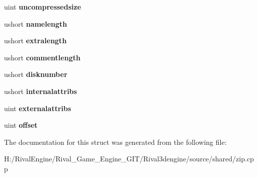 \begin{DoxyCompactItemize}
uint {\bfseries uncompressedsize}
\item 
\mbox{\label{structzipfileheader_a9992359c9a816960ff7c7295aee3c52a}} 
ushort {\bfseries namelength}
\item 
\mbox{\label{structzipfileheader_a2fe6aabe7028fce47fe00f43532910d1}} 
ushort {\bfseries extralength}
\item 
\mbox{\label{structzipfileheader_a19f6923a955cc2fe518b5e8c51937816}} 
ushort {\bfseries commentlength}
\item 
\mbox{\label{structzipfileheader_a87f957d3913b36c75a292b3b263125f3}} 
ushort {\bfseries disknumber}
\item 
\mbox{\label{structzipfileheader_a98e4a8df6c1a56bab905e50847f29d10}} 
ushort {\bfseries internalattribs}
\item 
\mbox{\label{structzipfileheader_ac8f652199a8083d84f64ea8463fd4cea}} 
uint {\bfseries externalattribs}
\item 
\mbox{\label{structzipfileheader_a647e71a9b17ab2a2e816a0e29e4ad6ce}} 
uint {\bfseries offset}
\end{DoxyCompactItemize}


The documentation for this struct was generated from the following file\+:\begin{DoxyCompactItemize}
\item 
H\+:/\+Rival\+Engine/\+Rival\+\_\+\+Game\+\_\+\+Engine\+\_\+\+G\+I\+T/\+Rival3dengine/source/shared/zip.\+cpp\end{DoxyCompactItemize}
